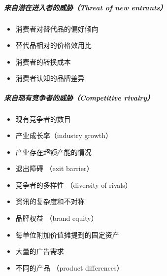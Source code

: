 \documentclass[letterpaper,11pt,english]{sphinxmanual}
\begin{document}
\subparagraph{来自潜在进入者的威胁（Threat of new entrants）}
\label{\detokenize{chapter_knowledge/BRD:threat-of-new-entrants}}\begin{itemize}
\item {} 
消费者对替代品的偏好倾向

\item {} 
替代品相对的价格效用比

\item {} 
消费者的转换成本

\item {} 
消费者认知的品牌差异

\end{itemize}


\subparagraph{来自现有竞争者的威胁（Competitive rivalry）}
\label{\detokenize{chapter_knowledge/BRD:competitive-rivalry}}\begin{itemize}
\item {} 
现有竞争者的数目

\item {} 
产业成长率（industry growth）

\item {} 
产业存在超额产能的情况

\item {} 
退出障碍 （exit barrier）

\item {} 
竞争者的多样性 （diversity of rivals）

\item {} 
资讯的复杂度和不对称

\item {} 
品牌权益 （brand equity）

\item {} 
每单位附加价值摊提到的固定资产

\item {} 
大量的广告需求

\item {} 
不同的产品 （product differences）

\end{itemize}
\end{document}
